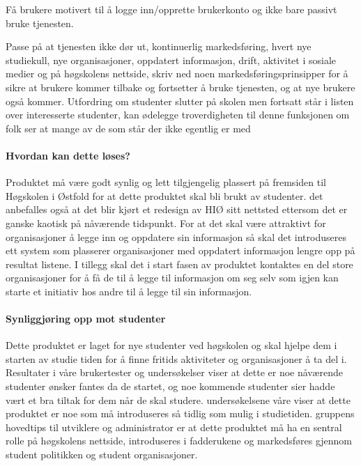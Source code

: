 Få brukere motivert til å logge inn/opprette brukerkonto og ikke bare passivt bruke tjenesten.

Passe på at tjenesten ikke dør ut, kontinuerlig markedsføring, hvert nye studiekull, nye organisasjoner, oppdatert informasjon, drift, aktivitet i sosiale medier og på høgskolens nettside, skriv ned noen markedsføringsprinsipper for å sikre at brukere kommer tilbake og fortsetter å bruke tjenesten, og at nye brukere også kommer. Utfordring om studenter slutter på skolen men fortsatt står i listen over interesserte studenter, kan ødelegge troverdigheten til denne funksjonen om folk ser at mange av de som står der ikke egentlig er med

\paragraph{Hvordan kan dette løses?}

Produktet må være godt synlig og lett tilgjengelig plassert på fremsiden til Høgskolen i Østfold for at dette produktet skal bli brukt av studenter. det anbefalles også at det blir kjørt et redesign av HIØ sitt nettsted ettersom det er ganske kaotisk på nåværende tidspunkt. For at det skal være attraktivt for organisasjoner å legge inn og oppdatere sin informasjon så skal det introduseres ett system som plasserer organisasjoner med oppdatert informasjon lengre opp på resultat listene. I tillegg skal det i start fasen av produktet kontaktes en del store organisasjoner for å få de til å legge til informasjon om seg selv som igjen kan starte et initiativ hos andre til å legge til sin informasjon. 


\paragraph{Synliggjøring opp mot studenter}

Dette produktet er laget for nye studenter ved høgskolen og skal hjelpe dem i starten av studie tiden for å finne fritids aktiviteter og organisasjoner å ta del i. Resultater i våre brukertester og undersøkelser viser at dette er noe nåværende studenter ønsker fantes da de startet, og noe kommende studenter sier hadde vært et bra tiltak for dem når de skal studere. 
undersøkelsene våre viser at dette produktet er noe som må introduseres så tidlig som mulig i studietiden. gruppens hovedtips til utviklere og administrator er at dette produktet må ha en sentral rolle på høgskolens nettside, introduseres i fadderukene og markedsføres gjennom student politikken og student organisasjoner.

